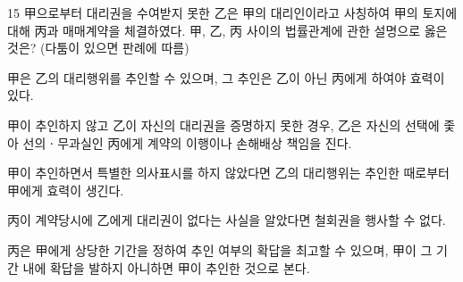 \begin{question}{15}
甲으로부터 대리권을 수여받지 못한 乙은 甲의 대리인이라고 사칭하여 甲의 토지에 대해 丙과 매매계약을 체결하였다. 甲, 乙, 丙 사이의 법률관계에 관한 설명으로 옳은 것은? (다툼이 있으면 판례에 따름)
\begin{choices}
  \item 甲은 乙의 대리행위를 추인할 수 있으며, 그 추인은 乙이 아닌 丙에게 하여야 효력이 있다.
  \item 甲이 추인하지 않고 乙이 자신의 대리권을 증명하지 못한 경우, 乙은 자신의 선택에 좇아 선의ㆍ무과실인 丙에게 계약의 이행이나 손해배상 책임을 진다.
  \item 甲이 추인하면서 특별한 의사표시를 하지 않았다면 乙의 대리행위는 추인한 때로부터 甲에게 효력이 생긴다.
  \item 丙이 계약당시에 乙에게 대리권이 없다는 사실을 알았다면 철회권을 행사할 수 없다.
  \item 丙은 甲에게 상당한 기간을 정하여 추인 여부의 확답을 최고할 수 있으며, 甲이 그 기간 내에 확답을 발하지 아니하면 甲이 추인한 것으로 본다.
\end{choices}
\end{question}
